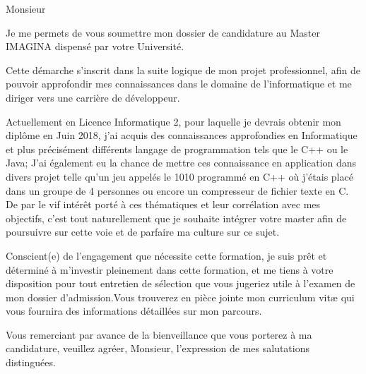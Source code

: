 \documentclass[11pt,a4paper,sans]{moderncv}        %
\begin{document}
\clearpage
\date{Montpellier, le 9 février 2017}
\opening{Monsieur}
\closing{}

\makelettertitle

Je me permets de vous soumettre mon dossier de candidature au Master IMAGINA dispensé par votre Université.
 
Cette démarche s’inscrit dans la suite logique de mon projet professionnel, afin de pouvoir approfondir mes connaissances dans le domaine de l'informatique et me diriger vers une carrière de développeur.
 
Actuellement en Licence Informatique 2, pour laquelle je devrais obtenir mon diplôme en Juin 2018, j’ai acquis des connaissances approfondies en Informatique et plus précisément différents langage de programmation tels que le C++ ou le Java; J'ai également eu la chance de mettre ces connaissance en application
dans divers projet telle qu'un jeu appelés le 1010 programmé en C++ où j'étais placé dans un groupe de 4 personnes ou encore un compresseur de fichier texte en C.
De par le vif intérêt porté à ces thématiques et leur corrélation avec mes objectifs, c’est tout naturellement que je souhaite intégrer votre master afin de poursuivre sur cette voie et de parfaire ma culture sur ce sujet.
 
Conscient(e) de l’engagement que nécessite cette formation, je suis prêt et déterminé à m’investir pleinement dans cette formation, et me tiens à votre disposition pour tout entretien de sélection que vous jugeriez utile à l’examen de mon dossier d’admission.Vous trouverez en pièce jointe mon curriculum vitæ qui vous fournira des informations détaillées sur mon parcours.
 
Vous remerciant par avance de la bienveillance que vous porterez à ma candidature, veuillez agréer, Monsieur, l’expression de mes salutations distinguées.
 



\makeletterclosing

\end{document}
